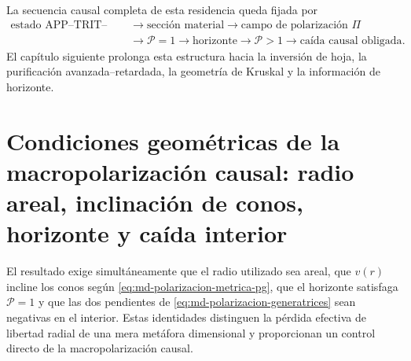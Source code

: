 La secuencia causal completa de esta residencia queda fijada por
\begin{equation}
\begin{aligned}
 \text{estado APP--TRIT--TPK}
 &\longrightarrow
 \text{sección material}
 \longrightarrow
 \text{campo de polarización }\Pi\\
 &\longrightarrow
 \mathcal P=1
 \longrightarrow
 \text{horizonte}
 \longrightarrow
 \mathcal P>1
 \longrightarrow
 \text{caída causal obligada}.
\end{aligned}
 \label{eq:md-polarizacion-cadena}
\end{equation}
El capítulo siguiente prolonga esta estructura hacia la inversión de hoja,
la purificación avanzada--retardada, la geometría de Kruskal y la información
de horizonte.

\section{Condiciones geométricas de la macropolarización causal: radio areal, inclinación de conos, horizonte y caída interior}
\label{sec:md-polarizacion-control}

El resultado exige simultáneamente que el radio utilizado sea areal, que
\(v(r)\) incline los conos según \eqref{eq:md-polarizacion-metrica-pg}, que
el horizonte satisfaga \(\mathcal P=1\) y que las dos pendientes de
\eqref{eq:md-polarizacion-generatrices} sean negativas en el interior. Estas
identidades distinguen la pérdida efectiva de libertad radial de una mera
metáfora dimensional y proporcionan un control directo de la
macropolarización causal.
